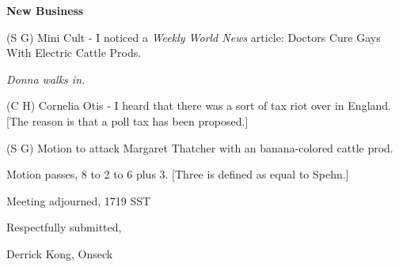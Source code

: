 \vspace{0.15in}
{\bf New Business}

(S G) Mini Cult - I noticed a {\em Weekly World News} article: Doctors
Cure Gays With Electric Cattle Prods.

{\em Donna walks in.}

(C H) Cornelia Otis - I heard that there was a sort of tax riot over
in England.  [The reason is that a poll tax has been proposed.]

(S G) Motion to attack Margaret Thatcher with an banana-colored cattle
prod.

Motion passes, 8 to 2 to 6 plus 3.  [Three is defined as equal to Spehn.]

Meeting adjourned, 1719 SST 

\vspace{0.15in}
\begin{center}
Respectfully submitted,

Derrick Kong, Onseck
\end{center}

